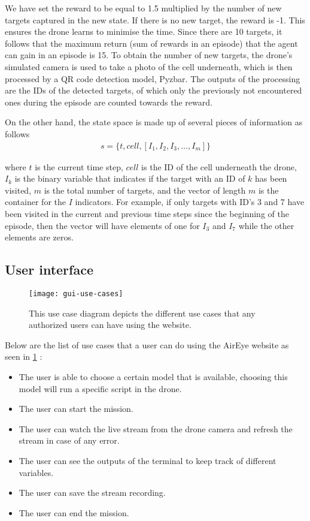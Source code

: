 \documentclass[../main.tex]{subfiles}
\begin{document}
We have set the reward to be equal to 1.5 multiplied by 
the number of new targets captured in the new state.
If there is no new target, the reward is -1. 
This ensures the drone learns to
minimise the time.
Since there are 10 targets, it follows that the maximum
return (sum of rewards in an episode) that the agent can gain  
in an episode is 15.
To obtain the number of new targets, the drone's simulated camera is
used to take a photo of the cell
underneath, which is then processed by a QR code detection 
model, Pyzbar. 
The outputs of the processing are the IDs of 
the detected targets, 
of which only the previously not encountered ones during 
the episode are counted towards the reward.

On the other hand, the state space is made up of several 
pieces of information as follows
\begin{align}
	s = \{ t, cell, [ I_1, I_2, I_3, \ldots, I_m] \} 
	\label{eq:state-space}
\end{align}

\noindent 
where $t$ is the current time step, $cell$ is the ID of the
cell underneath the drone, $I_k$ is the binary variable 
that indicates if the target with an ID of $k$ has been
visited, $m$ is the total number of targets,
and the vector of length $m$ is the container for the
$I$ indicators. 
For example,
if only targets with ID's 3 and 7 have been visited
in the current and previous time steps since the beginning of the 
episode,
then the vector will have elements of one for $I_3$ and $I_7$ while
the other elements are zeros.

\subsection{User interface}

\begin{figure}[tbp] 
	\centering
	\texttt{[image: gui-use-cases]} 
	\caption{This use case diagram depicts the different use cases that any authorized users can have using the website.}
	\label{fig:gui-use-cases} 
\end{figure}

Below are the list of use cases that a user can do using the AirEye website as seen in \cref{fig:gui-use-cases} : 
\begin{itemize}	
	\item The user is able to choose a certain model that is available, choosing this model will run a specific script in the drone. 
	\item The user can start the mission.
	\item The user can watch the live stream from the drone camera and refresh the stream in case of any error.
	\item The user can see the outputs of the terminal to keep track of different variables.
	\item The user can save the stream recording. 
	\item The user can end the mission.
\end{itemize}
\end{document}
